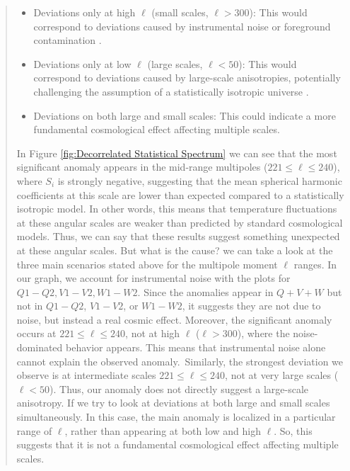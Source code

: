 \documentclass{article}
\theoremstyle{definition}
\begin{document}
\begin{abstract}
\begin{itemize}
	\item Deviations only at high $\ell$ (small scales, $\ell > 300$): This would correspond to deviations caused by instrumental noise or foreground contamination \cite{Kashino_2012}.

	\item Deviations only at low $\ell$ (large scales, $\ell < 50$): This would correspond to deviations caused by large-scale anisotropies, potentially challenging the assumption of a statistically isotropic universe \cite{Bielewicz_2004}\cite{Pedro_2013}.

	\item Deviations on both large and small scales: This could indicate a more fundamental cosmological effect affecting multiple scales.
\end{itemize}

In Figure \ref{fig:Decorrelated Statistical Spectrum} we can see that the most significant anomaly appears in the mid-range multipoles ($221 \leq \ell \leq 240$), where $S_i$ is strongly negative, suggesting that the mean spherical harmonic coefficients at this scale are lower than expected compared to a statistically isotropic model. In other words, this means that temperature fluctuations at these angular scales are weaker than predicted by standard cosmological models.
Thus, we can say that these results suggest something unexpected at these angular scales. But what is the cause? we can take a look at the three main scenarios stated above for the multipole moment $\ell$ ranges.
In our graph, we account for instrumental noise with the plots for $Q1-Q2, V1-V2, W1-W2$. Since the anomalies appear in $Q+V+W$ but not in $Q1-Q2$, $V1-V2$, or $W1-W2$, it suggests they are not due to noise, but instead a real cosmic effect. Moreover, the significant anomaly occurs at $221 \leq \ell \leq 240$, not at high $\ell$ ($\ell > 300$), where the noise-dominated behavior appears. This means that instrumental noise alone cannot explain the observed anomaly.\
Similarly, the strongest deviation we observe is at intermediate scales $221 \leq \ell \leq 240$, not at very large scales ($\ell < 50$). Thus, our anomaly does not directly suggest a large-scale anisotropy.
If we try to look at deviations at both large and small scales simultaneously. In this case, the main anomaly is localized in a particular range of $\ell$, rather than appearing at both low and high $\ell$. So, this suggests that it is not a fundamental cosmological effect affecting multiple scales.


\end{abstract}
\end{document}
